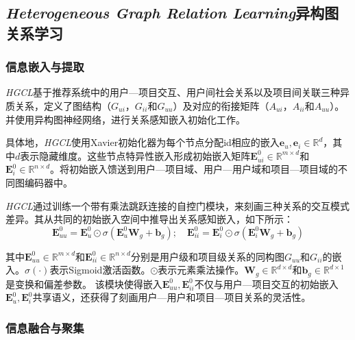 \documentclass{article}
\begin{document}
\subsection{\emph{Heterogeneous Graph Relation Learning}异构图关系学习}

\subsubsection{信息嵌入与提取}

\emph{HGCL}基于推荐系统中的用户—项目交互、用户间社会关系以及项目间关联三种异质关系，定义了图结构（$G_{ui}$，$G_{ii}$和$G_{uu}$）及对应的衔接矩阵（$A_{ui}$，$A_{ii}$和$A_{uu}$）。并使用异构图神经网络，进行关系感知嵌入初始化工作。

具体地，\emph{HGCL}使用Xavier初始化器\cite{pmlr-v9-glorot10a}为每个节点分配id相应的嵌入$\mathbf{e}_u,\mathbf{e}_i\in\mathbb{R}^d$，其中$d$表示隐藏维度。这些节点特异性嵌入形成初始嵌入矩阵$\mathbf{E}_{ui}^0\in\mathbb{R}^{m\times d}$和$\mathbf{E}_i^0\in\mathbb{R}^{n\times d}$。将初始嵌入馈送到用户—项目域、用户—用户域和项目—项目域的不同图编码器中。

\emph{HGCL}通过训练一个带有乘法跳跃连接\cite{pmlr-v70-dauphin17a}的自控门模块\cite{yu2022selfsupervisedmultichannelhypergraphconvolutional}，来刻画三种关系的交互模式差异。其从共同的初始嵌入空间中推导出关系感知嵌入，如下所示：
\begin{equation}
\mathbf{E}_{uu}^0 = \mathbf{E}_u^0 \odot \sigma(\mathbf{E}_u^0\mathbf{W}_g+\mathbf{b}_g); \quad \mathbf{E}_{ii}^0 = \mathbf{E}_i^0 \odot \sigma(\mathbf{E}_i^0\mathbf{W}_g+\mathbf{b}_g)
\end{equation}

其中$\mathbf{E}_{uu}^0\in\mathbb{R}^{m\times d}$和$\mathbf{E}_{ii}^0\in\mathbb{R}^{n\times d}$分别是用户级和项目级关系的同构图$G_{uu}$和$G_{ii}$的嵌入。$\sigma(\cdot)$表示Sigmoid激活函数。$\odot$表示元素乘法操作。$\mathbf{W}_g\in\mathbb{R}^{d\times d}$和$\mathbf{b}_g\in\mathbb{R}^{d\times 1}$是变换和偏差参数。
该模块使得嵌入$\mathbf{E}_{uu}^0,\mathbf{E}_{ii}^0$不仅与用户—项目交互的初始嵌入$\mathbf{E}_u^0,\mathbf{E}_i^0$共享语义，还获得了刻画用户—用户和项目—项目关系的灵活性。

\subsubsection{信息融合与聚集}
\end{document}
